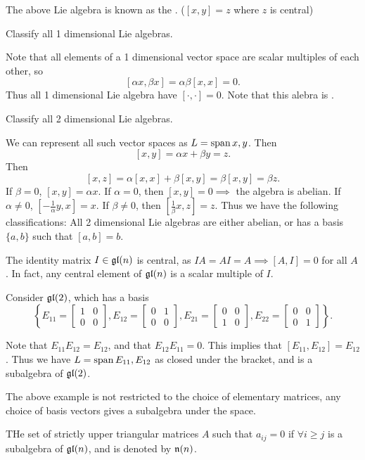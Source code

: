 The above Lie algebra is known as the . ($[x,y] = z$ where $z$ is central)

\begin{example}
Classify all 1 dimensional Lie algebras. 
\end{example}
Note that all elements of a 1 dimensional vector space are scalar multiples of each other,  so 
\[ [\alpha x, \beta x] = \alpha\beta [x,x] = 0. \] Thus all 1 dimensional Lie algebra have $[\cdot, \cdot] = 0$. Note that this alebra is . 

\begin{example}
Classify all 2 dimensional Lie algebras. 
\end{example}
We can represent all such vector spaces as $L = \operatorname{span}{x,y}$. Then 
\[ [x,y] = \alpha x + \beta y = z. \] Then 
\[ [x,z] = \alpha[x,x] + \beta[x,y] = \beta[x,y] = \beta z. \] If $\beta = 0$, $[x,y] = \alpha x$. If $\alpha = 0$, then $[x,y] = 0 \implies$ the algebra is abelian. If $\alpha \neq 0$, $[-\frac{1}{\alpha}y, x] = x$. If $\beta \neq 0$, then $[\frac{1}{\beta}x, z] = z$. 
Thus we have the following classifications: 
All 2 dimensional Lie algebras are either abelian, or has a basis $\{a,b\}$ such that $[a,b] = b$. 

\begin{remark*}
The identity matrix $I \in \frak{gl}(n)$ is central, as $IA = AI = A \implies [A,I] = 0$ for all $A$. In fact, any central element of $\frak{gl}(n)$ is a scalar multiple of $I$. 
\end{remark*}

\begin{example}
Consider $\frak{gl}(2)$, which has a basis 
\[ \left \{ E_{11} = \begin{bmatrix} 1 & 0 \\ 0 & 0 \end{bmatrix}, E_{12} = \begin{bmatrix} 0 & 1 \\ 0 & 0 \end{bmatrix},E_{21} = \begin{bmatrix} 0 & 0 \\ 1 & 0 \end{bmatrix}, E_{22} = \begin{bmatrix} 0 & 0 \\ 0 & 1\end{bmatrix} \right \}. \]

Note that $E_{11}E_{12} = E_{12}$, and that $E_{12}E_{11} = 0$. This implies that $[E_{11},E_{12}] = E_{12}$. Thus we have $L = \operatorname{span}{E_{11}, E_{12}}$ as closed under the bracket, and is a subalgebra of $\frak{gl}(2)$. 
\end{example}
The above example is not restricted to the choice of elementary matrices, any choice of basis vectors gives a subalgebra under the space. 
\begin{example}
THe set of strictly upper triangular matrices $A$ such that $a_{ij} = 0$ if $\forall i \geq j$ is a subalgebra of $\frak{gl}(n)$, and is denoted by $\frak{n}(n)$. 
\end{example}
